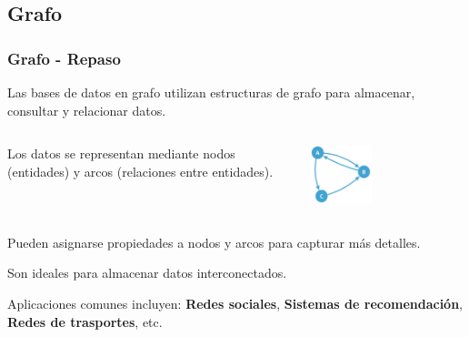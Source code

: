 \subsection{Grafo}

\begin{frame}
    \frametitle{Grafo - Repaso}

    Las bases de datos en grafo utilizan estructuras de grafo para almacenar, consultar y relacionar datos. 

     
    
    \begin{columns}
        \begin{column}{0.48\textwidth}
            Los datos se representan mediante nodos (entidades) y arcos (relaciones entre entidades).
        \end{column}
        \begin{column}{0.48\textwidth}
            \centering
            \includegraphics[width=0.4\textwidth]{images/Grafo.png}
        \end{column}
    \end{columns}

     

    \vspace{0.3cm}
    
    Pueden asignarse propiedades a nodos y arcos para capturar más detalles.

     
    
    Son ideales para almacenar datos interconectados.  

     
    
    Aplicaciones comunes incluyen: \textbf{Redes sociales}, \textbf{Sistemas de recomendación}, \textbf{Redes de trasportes}, etc.

    
\end{frame}

